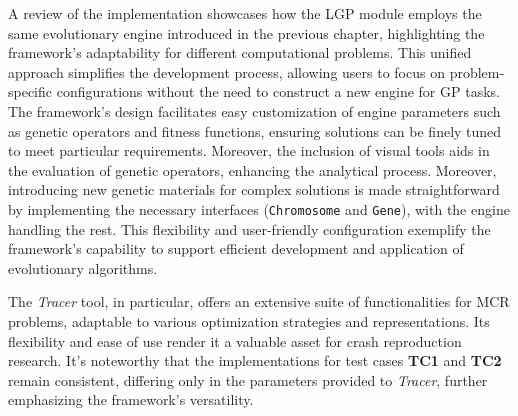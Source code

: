     A review of the implementation showcases how the LGP module employs the same evolutionary engine introduced 
    in the previous chapter, highlighting the framework's adaptability for different computational problems. This 
    unified approach simplifies the development process, allowing users to focus on problem-specific configurations 
    without the need to construct a new engine for GP tasks. The framework's design facilitates easy customization of 
    engine parameters such as genetic operators and fitness functions, ensuring solutions can be finely tuned to meet 
    particular requirements. Moreover, the inclusion of visual tools aids in the evaluation of genetic operators, 
    enhancing the analytical process. Moreover, introducing new genetic materials for complex solutions is made 
    straightforward by implementing the necessary interfaces (\texttt{Chromosome} and \texttt{Gene}), with the engine 
    handling the rest. This flexibility and user-friendly configuration exemplify the framework's capability to support 
    efficient development and application of evolutionary algorithms.

    The \textit{Tracer} tool, in particular, offers an extensive suite of functionalities for MCR problems, adaptable 
    to various optimization strategies and representations. Its flexibility and ease of use render it a valuable 
    asset for crash reproduction research. It's noteworthy that the implementations for test cases \textbf{TC1} and 
    \textbf{TC2} remain consistent, differing only in the parameters provided to \textit{Tracer}, further emphasizing 
    the framework's versatility.
